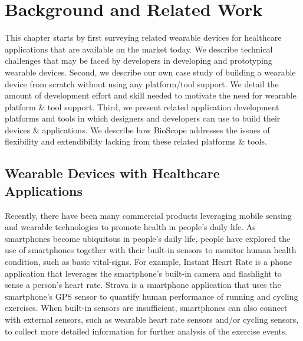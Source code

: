 \chapter{Background and Related Work}
This chapter starts by first surveying related wearable devices for healthcare applications that are available on the market today.
We describe technical challenges that may be faced by developers in developing and prototyping wearable devices.
Second, we describe our own case study of building a wearable device from scratch without using any platform/tool support.
We detail the amount of development effort and skill needed to motivate the need for wearable platform \& tool support.
Third, we present related application development platforms and tools in which designers and developers can use to build their devices \& applications.
We describe how BioScope addresses the issues of flexibility and extendibility lacking from these related platforms \& tools.

\section{Wearable Devices with Healthcare Applications}
Recently, there have been many commercial products leveraging mobile sensing and wearable technologies to promote health in people's daily life. As smartphones become ubiquitous in people's daily life, people have explored the use of smartphones together with their built-in sensors to monitor human health condition, such as basic vital-signs. For example, Instant Heart Rate \cite{Instant_Heart_Rate} is a phone application that leverages the smartphone's built-in camera and flashlight to sense a person's heart rate. Strava \cite{Strava} is a smartphone application that uses the smartphone's GPS sensor to quantify human performance of running and cycling exercises. When built-in sensors are insufficient, smartphones can also connect with external sensors, such as wearable heart rate sensors and/or cycling sensors, to collect more detailed information for further analysis of the exercise events.


